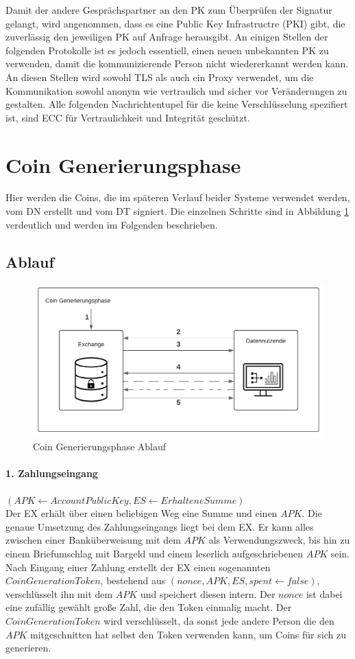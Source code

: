 \documentclass[
	fontsize=11pt,
	headings=small,
	parskip=half,           %
	bibliography=totoc,
	numbers=noenddot,       %
	open=any,               %
]{scrreprt}
\begin{document}
Damit der andere Gesprächspartner an den PK zum Überprüfen der Signatur gelangt, wird angenommen, dass es eine Public Key Infrastructre (PKI) gibt, die zuverlässig den jeweiligen PK auf Anfrage herausgibt. An einigen Stellen der folgenden Protokolle ist es jedoch essentiell, einen neuen unbekannten PK zu verwenden, damit die kommunizierende Person nicht wiedererkannt werden kann. An diesen Stellen wird sowohl TLS als auch ein Proxy verwendet, um die Kommunikation sowohl anonym wie vertraulich und sicher vor Veränderungen zu gestalten. Alle folgenden Nachrichtentupel für die keine Verschlüsselung spezifiert ist, sind ECC für Vertraulichkeit und Integrität geschützt.

\section{Coin Generierungsphase}
\label{system:coingeneration}
Hier werden die Coins, die im späteren Verlauf beider Systeme verwendet werden, vom DN erstellt und vom DT signiert. Die einzelnen Schritte sind in Abbildung \ref{fig:coin-generationphase} verdeutlich und werden im Folgenden beschrieben.
\subsection{Ablauf}
\begin{figure}[H]
    \centering
    \includegraphics[width=0.7\linewidth]{CoinGenerationPhaseDiagramm.pdf}
    \caption{Coin Generierungsphase Ablauf}
    \label{fig:coin-generationphase}
\end{figure}

\paragraph{1. Zahlungseingang} $(APK \leftarrow AccountPublicKey, ES \leftarrow ErhalteneSumme)$\\
Der EX erhält über einen beliebigen Weg eine Summe und einen $APK$. Die genaue Umsetzung des Zahlungseingangs liegt bei dem EX. Er kann alles zwischen einer Banküberweisung mit dem $APK$ als Verwendungszweck, bis hin zu einem Briefumschlag mit Bargeld und einem leserlich aufgeschriebenen $APK$ sein. Nach Eingang einer Zahlung erstellt der EX einen sogenannten $CoinGenerationToken$, bestehend aus $(nonce, APK, ES, spent \leftarrow false)$, verschlüsselt ihn mit dem $APK$ und speichert diesen intern. Der $nonce$ ist dabei eine zufällig gewählt große Zahl, die den Token einmalig macht. Der $CoinGenerationToken$ wird verschlüsselt, da sonst jede andere Person die den $APK$ mitgeschnitten hat selbst den Token verwenden kann, um Coins für sich zu generieren.
\end{document}

